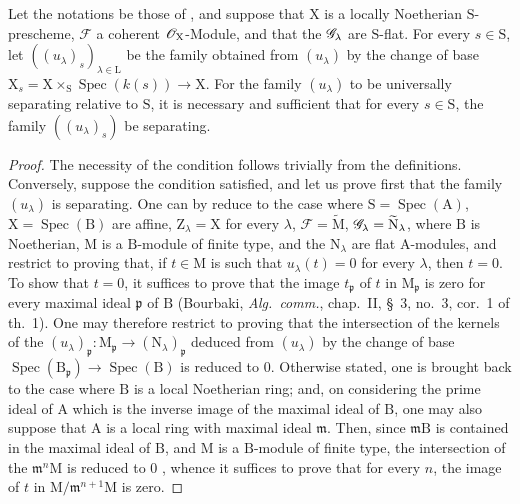 \begin{theorem}[11.9.16]
\label{IV.11.9.16}
Let the notations be those of , and suppose that $\mathrm{X}$ is a locally Noetherian $\mathrm{S}$-prescheme, $\mathscr{F}$ a coherent $\mathscr{O}_\mathrm{X}$-Module, and that the $\mathscr{G}_\lambda$ are $\mathrm{S}$-flat.
For every $s\in\mathrm{S}$, let $((u_\lambda)_s)_{\lambda\in\mathrm{L}}$ be the family obtained from $(u_\lambda)$ by the change of base $\mathrm{X}_s=\mathrm{X}\times_\mathrm{S}\operatorname{Spec}(k(s))\to\mathrm{X}$.
For the family $(u_\lambda)$ to be universally separating relative to $\mathrm{S}$, it is necessary and sufficient that for every $s\in\mathrm{S}$, the family $((u_\lambda)_s)$ be separating.
\end{theorem}

\begin{proof}
The necessity of the condition follows trivially from the definitions.
Conversely, suppose the condition satisfied, and let us prove first that the family $(u_\lambda)$ is separating.
One can by  reduce to the case where $\mathrm{S}=\operatorname{Spec}(\mathrm{A})$, $\mathrm{X}=\operatorname{Spec}(\mathrm{B})$ are affine, $\mathrm{Z}_\lambda=\mathrm{X}$ for every $\lambda$, $\mathscr{F}=\widetilde{\mathrm{M}}$, $\mathscr{G}_\lambda=\widetilde{\mathrm{N}}_\lambda$, where $\mathrm{B}$ is Noetherian, $\mathrm{M}$ is a $\mathrm{B}$-module of finite type, and the $\mathrm{N}_\lambda$ are flat $\mathrm{A}$-modules, and restrict to proving that, if $t\in\mathrm{M}$ is such that $u_\lambda(t)=0$ for every $\lambda$, then $t=0$.
To show that $t=0$, it suffices to prove that the image $t_\mathfrak{p}$ of $t$ in $\mathrm{M}_\mathfrak{p}$ is zero for every maximal ideal $\mathfrak{p}$ of $\mathrm{B}$ (Bourbaki, \emph{Alg.\ comm.}, chap.~II, \S~3, no.~3, cor.~1 of th.~1).
One may therefore restrict to proving that the intersection
of the kernels of the $(u_\lambda)_\mathfrak{p}:\mathrm{M}_\mathfrak{p}\to(\mathrm{N}_\lambda)_\mathfrak{p}$ deduced from $(u_\lambda)$ by the change of base $\operatorname{Spec}(\mathrm{B}_\mathfrak{p})\to\operatorname{Spec}(\mathrm{B})$ is reduced to $0$.
Otherwise stated, one is brought back to the case where $\mathrm{B}$ is a local Noetherian ring; and, on considering the prime ideal of $\mathrm{A}$ which is the inverse image of the maximal ideal of $\mathrm{B}$, one may also suppose that $\mathrm{A}$ is a local ring with maximal ideal $\mathfrak{m}$.
Then, since $\mathfrak{m}\mathrm{B}$ is contained in the maximal ideal of $\mathrm{B}$, and $\mathrm{M}$ is a $\mathrm{B}$-module of finite type, the intersection of the $\mathfrak{m}^{n}\mathrm{M}$ is reduced to $0$ , whence it suffices to prove that for every $n$, the image of $t$ in $\mathrm{M}/\mathfrak{m}^{n+1}\mathrm{M}$ is zero.

\end{proof}
